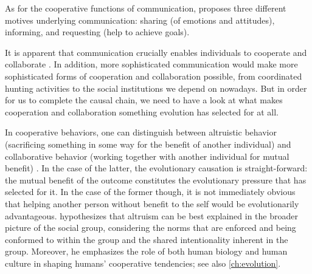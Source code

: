 As for the cooperative functions of communication, \citet{Tomasello08-origins} proposes three different motives underlying communication: sharing (of emotions and attitudes), informing, and requesting (help to achieve goals).

It is apparent that communication crucially enables individuals to cooperate and collaborate . In addition, more sophisticated communication would make more sophisticated forms of cooperation and collaboration possible, from coordinated hunting activities to the social institutions we depend on nowadays.
But in order for us to complete the causal chain, we need to have a look at what makes cooperation and collaboration something evolution has selected for at all.

In cooperative behaviors, one can distinguish between altruistic behavior (sacrificing something in some way for the benefit of another individual) and collaborative behavior (working together with another individual for mutual benefit) \citep{Tomasello09}. In the case of the latter, the evolutionary causation is straight-forward: the mutual benefit of the outcome constitutes the evolutionary pressure that has selected for it. In the case of the former though, it is not immediately obvious that helping another person without benefit to the self would be evolutionarily advantageous. \citep{Tomasello09} hypothesizes that altruism can be best explained in the broader picture of the social group, considering the norms that are enforced and being conformed to within the group and the shared intentionality inherent in the group.
Moreover, he emphasizes the role of both human biology and human culture in shaping humans' cooperative tendencies; see also \cref{ch:evolution}.

